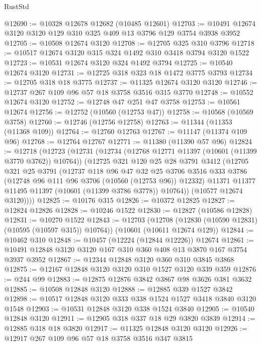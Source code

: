 \begin{lexlean}{RustStd}
\begin{coremodule}
@12690 := @10328 @12678 @12682 (@10485 @12601)
@12703 := @10491 @12674 @3120 @3120 @129 @310 @325 @409 @13 @3796 @129 @3754 @3938 @3952
@12705 := @10508 @12674 @3120
@12708 := @12705 @325 @310 @3796
@12718 := @10517 @12674 @3120 @315 @324 @1492 @310 @3418 @3794 @3120 @1522
@12723 := @10531 @12674 @3120 @324 @1492 @3794
@12725 := @10540 @12674 @3120
@12731 := @12725 @318 @323 @18 @1472 @3775 @3793
@12734 := @12705 @318 @18 @3775
@12737 := @11325 @12674 @3120 @3120
@12746 := @12737 @267 @109 @96 @57 @18 @3758 @3516 @315 @3770
@12748 := @10552 @12674 @3120
@12752 := @12748 @47 @251 @47 @3758
@12753 := @10561 @12674
@12756 := @12752 (@10560 (@12753 @47))
@12758 := @10568 (@10569 @3758)
@12760 := @12746 (@12756 @12758)
@12763 := @11344 (@11353 (@11368 @109))
@12764 := @12760 @12763
@12767 := @11147 (@11374 @109 @96)
@12768 := @12764 @12767
@12771 := @11380 (@11390 @57 @96)
@12824 := @12718
    (@12723
      (@12731
        (@12734 (@12768 @12771 @11397 (@10601 (@11399 @3770 @3762)) @10764))
        (@12725
          @321
          @120
          @25
          @28
          @3791
          @3412
          (@12705
            @321
            @25
            @3791
            (@12737
              @118
              @96
              @47
              @32
              @25
              @3706
              @3516
              @333
              @3786
              (@12748 @96 @111 @96 @3706 (@10560 (@12753 @96)) @12332)
              @11371
              @11377
              @11495
              @11397
              (@10601 (@11399 @3786 @3778))
              @10764))
          (@10577 @12674 @3120))))
@12825 := @10176 @315
@12826 := @10372 @12825
@12827 := @12824 @12826
@12828 := @10246 @1522
@12830 := @12827 (@10586 @12828)
@12831 := @10270 @1522
@12843 := @12703
    (@12708 (@12830 (@10590 @12831) (@10595 (@10597 @315)) @10764))
    (@10601 (@10611 @12674 @129))
@12844 := @10462 @310
@12848 := @10457 (@12224 (@12844 @12226)) @12674
@12861 := @10491 @12848 @3120 @3120 @167 @310 @360 @408 @13 @3870 @167 @3754 @3937 @3952
@12867 := @12344 @12848 @3120 @360 @310 @3845 @3868
@12875 := @12167 @12848 @3120 @3120 @310 @1527 @3120 @339 @359
@12876 := @244 @99
@12883 := @12875 @12876 @3842 @3867 @98 @3626 @381 @3632
@12885 := @10508 @12848 @3120
@12888 := @12885 @339 @1527 @3842
@12898 := @10517 @12848 @3120 @333 @338 @1524 @1527 @3418 @3840 @3120 @1548
@12903 := @10531 @12848 @3120 @338 @1524 @3840
@12905 := @10540 @12848 @3120
@12911 := @12905 @318 @337 @18 @29 @3820 @3839
@12914 := @12885 @318 @18 @3820
@12917 := @11325 @12848 @3120 @3120
@12926 := @12917 @267 @109 @96 @57 @18 @3758 @3516 @347 @3815

\end{coremodule}
\end{lexlean}

